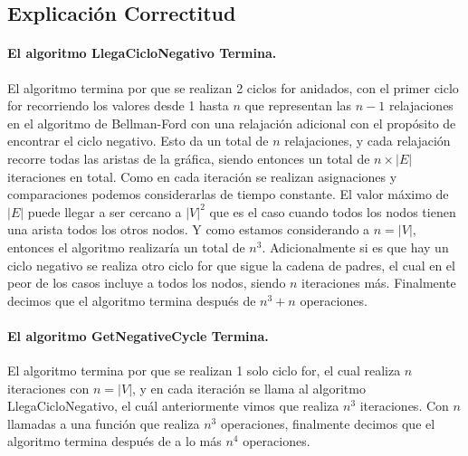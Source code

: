 \documentclass[12pt]{article}
\begin{document}
\subsection{Explicación Correctitud}
\paragraph{El algoritmo LlegaCicloNegativo Termina.}
El algoritmo termina por que se realizan 2 ciclos for anidados, con el primer ciclo for recorriendo los valores desde 1 hasta $n$ que representan las $n - 1$ relajaciones en el algoritmo de Bellman-Ford con una relajación adicional con el propósito de encontrar el ciclo negativo. Esto da un total de $n$ relajaciones, y cada relajación recorre todas las aristas de la gráfica, siendo entonces un total de $n\times|E|$ iteraciones en total. Como en cada iteración se realizan asignaciones y comparaciones podemos considerarlas de tiempo constante. El valor máximo de $|E|$ puede llegar a ser cercano a $|V|^2$ que es el caso cuando todos los nodos tienen una arista todos los otros nodos. Y como estamos considerando a $n=|V|$, entonces el algoritmo realizaría un total de $n^3$. Adicionalmente si es que hay un ciclo negativo se realiza otro ciclo for que sigue la cadena de padres, el cual en el peor de los casos incluye a todos los nodos, siendo $n$ iteraciones más. Finalmente decimos que el algoritmo termina después de $n^3 + n$ operaciones.
\paragraph{El algoritmo GetNegativeCycle Termina.}
El algoritmo termina por que se realizan 1 solo ciclo for, el cual realiza $n$ iteraciones con $n=|V|$, y en cada iteración se llama al algoritmo LlegaCicloNegativo, el cuál anteriormente vimos que realiza $n^3$ iteraciones. Con $n$  llamadas a una función que realiza $n^3$ operaciones, finalmente decimos que el algoritmo termina después de a lo más $n^4$ operaciones.
\end{document}
